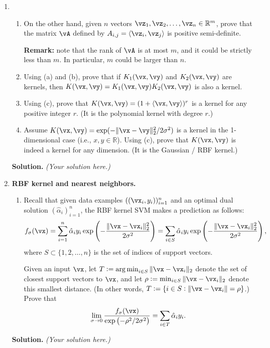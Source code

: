 \documentclass{article}
\DeclareMathOperator*{\argmin}{arg\,min}
\theoremstyle{definition}
\theoremstyle{remark}
\newenvironment{Q}
{%
\clearpage
\item
}
{%
\phantom{s}
\bigskip
\textbf{Solution.}
\emph{(Your solution here.)}
}
\begin{document}
\begin{enumerate}
\begin{Q}
\begin{enumerate}
        \item On the other hand, given $n$ vectors $\vz_1,\vz_2,\ldots,\vz_n\in \mathbb{R}^m$, prove that the matrix $\vA$ defined by $A_{i,j}=\langle\vz_i,\vz_j\rangle$ is positive semi-definite.

        \textbf{Remark:} note that the rank of $\vA$ is at most $m$, and it could be strictly less than $m$. In particular, $m$ could be larger than $n$.

        \item Using (a) and (b), prove that if $K_1(\vx,\vy)$ and $K_2(\vx,\vy)$ are kernels, then $K(\vx,\vy)=K_1(\vx,\vy) K_2(\vx,\vy)$ is also a kernel.

        \item Using (c), prove that $K(\vx,\vy)=(1+\langle\vx,\vy\rangle)^r$ is a kernel for any positive integer $r$. (It is the polynomial kernel with degree $r$.)

        \item Assume $K(\vx,\vy)=\exp(-\|\vx-\vy\|_2^2/2\sigma^2)$ is a kernel in the 1-dimensional case (i.e., $x,y\in \mathbb{R}$). Using (c), prove that $K(\vx,\vy)$ is indeed a kernel for any dimension. (It is the Gaussian / RBF kernel.)
    \end{enumerate}
\end{Q}

\begin{Q}
    \textbf{RBF kernel and nearest neighbors.}
    \begin{enumerate}
        \item Recall that given data examples $((\vx_i,y_i))_{i=1}^n$ and an optimal dual solution $(\hat{\alpha}_i)_{i=1}^n$, the RBF kernel SVM makes a prediction as follows:
        \begin{align*}
            f_{\sigma}(\vx)=\sum_{i=1}^{n}\hat{\alpha}_iy_i\exp\del{-\frac{\|\vx-\vx_i\|_2^2}{2\sigma^2}}=\sum_{i\in S}^{}\hat{\alpha}_iy_i\exp\del{-\frac{\|\vx-\vx_i\|_2^2}{2\sigma^2}},
        \end{align*}
        where $S\subset\{1,2,\ldots,n\}$ is the set of indices of support vectors.

        Given an input $\vx$, let $T:=\argmin_{i\in S}\|\vx-\vx_i\|_2$ denote the set of closest support vectors to $\vx$, and let $\rho:=\min_{i\in S}\|\vx-\vx_i\|_2$ denote this smallest distance.  (In other words, $T := \{ i \in S : \|\vx-\vx_i\| = \rho \}$.) Prove that
        \begin{align*}
            \lim_{\sigma\to0}\frac{f_{\sigma}(\vx)}{\exp\del{-\rho^2/2\sigma^2}}=\sum_{i\in T}^{}\hat{\alpha}_iy_i.
        \end{align*}


\end{enumerate}
\end{Q}
\end{enumerate}
\end{document}
